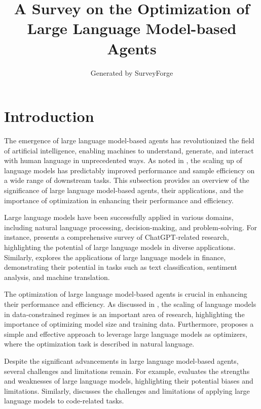\documentclass[11pt,a4paper]{article}
\title{A Survey on the Optimization of Large Language Model-based Agents}
\author{Generated by SurveyForge}
\date{}
\begin{document}
\maketitle
\tableofcontents
\newpage



\section{Introduction}


The emergence of large language model-based agents has revolutionized the field of artificial intelligence, enabling machines to understand, generate, and interact with human language in unprecedented ways. As noted in \cite{arxiv:2206.07682}, the scaling up of language models has predictably improved performance and sample efficiency on a wide range of downstream tasks. This subsection provides an overview of the significance of large language model-based agents, their applications, and the importance of optimization in enhancing their performance and efficiency.

Large language models have been successfully applied in various domains, including natural language processing, decision-making, and problem-solving. For instance, \cite{doi:10.1016/j.metrad.2023.100017} presents a comprehensive survey of ChatGPT-related research, highlighting the potential of large language models in diverse applications. Similarly, \cite{doi:10.1145/3604237.3626869} explores the applications of large language models in finance, demonstrating their potential in tasks such as text classification, sentiment analysis, and machine translation.

The optimization of large language model-based agents is crucial in enhancing their performance and efficiency. As discussed in \cite{arxiv:2305.16264}, the scaling of language models in data-constrained regimes is an important area of research, highlighting the importance of optimizing model size and training data. Furthermore, \cite{arxiv:2309.03409} proposes a simple and effective approach to leverage large language models as optimizers, where the optimization task is described in natural language.

Despite the significant advancements in large language model-based agents, several challenges and limitations remain. For example, \cite{doi:10.1007/s10849-023-09409-x} evaluates the strengths and weaknesses of large language models, highlighting their potential biases and limitations. Similarly, \cite{doi:10.18653/v1/2023.acl-long.411} discusses the challenges and limitations of applying large language models to code-related tasks.
\end{document}
